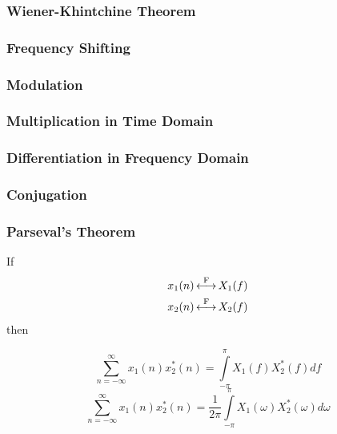 \subsubsection{Wiener-Khintchine Theorem}\label{subsubsec:FourierTransformProperties-WienerKhintchineTheorem}
\subsubsection{Frequency Shifting}\label{subsubsec:FourierTransformProperties-FrequencyShifting}
\subsubsection{Modulation}\label{subsubsec:FourierTransformProperties-Modulation}
\subsubsection{Multiplication in Time Domain}\label{subsubsec:FourierTransformProperties-MultiplicationTimeDomain}
\subsubsection{Differentiation in Frequency Domain}\label{subsubsec:FourierTransformProperties-DifferentiationFrequencyDomain}
\subsubsection{Conjugation}\label{subsubsec:FourierTransformProperties-Conjugation}
\subsubsection{Parseval's Theorem}\label{subsubsec:FourierTransformProperties-ParsevalsTheorem}
If
\begin{equation*}
  \begin{aligned}
    x_{1}(n) &\operatorname{\overset{F}{\longleftrightarrow}} X_{1}(f) \\
    x_{2}(n) &\operatorname{\overset{F}{\longleftrightarrow}} X_{2}(f) \\
  \end{aligned}
\end{equation*}
then

\begin{equation}\label{eq:FourierTransformProperties-ParsevalsTheorem-Frequency}
  \sum\limits_{n=-\infty}^{\infty} x_{1}(n) x_{2}^{*}(n) = \int\limits_{-\pi}^{\pi} X_{1}(f) X_{2}^{*}(f) df
\end{equation}
\begin{equation}\label{eq:FourierTransformProperties-ParsevalsTheorem-Omega}
  \sum\limits_{n=-\infty}^{\infty} x_{1}(n) x_{2}^{*}(n) = \frac{1}{2 \pi} \int\limits_{-\pi}^{\pi} X_{1}(\omega) X_{2}^{*}(\omega) d\omega
\end{equation}

